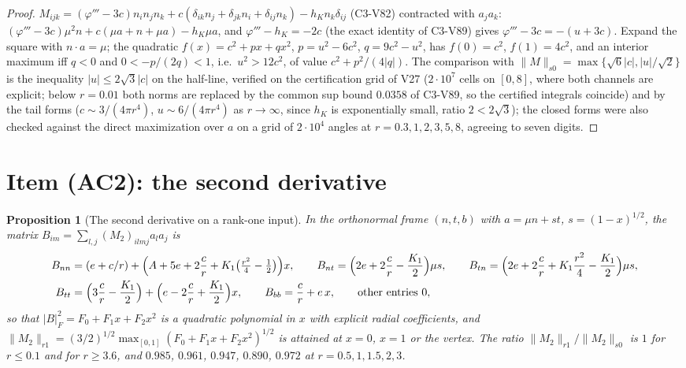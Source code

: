 \documentclass[11pt]{article}
\theoremstyle{plain}
\newtheorem{proposition}[theorem]{Proposition}
\theoremstyle{definition}
\theoremstyle{remark}
\begin{document}
\begin{proof}
\(M_{ijk}=(\varphi'''-3c)n_in_jn_k+c(\delta_{ik}n_j+\delta_{jk}n_i+\delta_{ij}n_k)-h_Kn_k\delta_{ij}\) (C3-V82) contracted
with \(a_ja_k\): \((\varphi'''-3c)\mu^2n+c(\mu a+n+\mu a)-h_K\mu a\), and \(\varphi'''-h_K=-2c\) (the exact
identity of C3-V89) gives \(\varphi'''-3c=-(u+3c)\).  Expand the square with
\(n\cdot a=\mu\); the quadratic \(f(x)=c^2+px+qx^2\), \(p=u^2-6c^2\), \(q=9c^2-u^2\), has
\(f(0)=c^2\), \(f(1)=4c^2\), and an interior maximum iff \(q<0\) and \(0<-p/(2q)<1\),
i.e.\ \(u^2>12c^2\), of value \(c^2+p^2/(4|q|)\).  The comparison with \(\|M\|_{s0}=\max\{\sqrt6|c|,|u|/\sqrt2\}\)
is the inequality \(|u|\le2\sqrt3|c|\) on the half-line, verified on the
certification grid of V27 (\(2\cdot10^7\) cells on \([0,8]\), where both channels are
explicit; below \(r=0.01\) both norms are replaced by the common sup bound
\(0.0358\) of C3-V89, so the certified integrals coincide) and by the
tail forms (\(c\sim3/(4\pi r^4)\), \(u\sim6/(4\pi r^4)\) as \(r\to\infty\), since \(h_K\) is exponentially
small, ratio \(2<2\sqrt3\)); the closed forms
were also checked against the direct maximization over \(a\) on a grid
of \(2\cdot10^4\) angles at \(r=0.3,1,2,3,5,8\), agreeing to seven digits.
\end{proof}

\section{Item (AC2): the second derivative}
\label{sec:c4v26-second}

\begin{proposition}[The second derivative on a rank-one input]
\label{prop:c4v26-second}
In the orthonormal frame \((n,t,b)\) with \(a=\mu n+st\), \(s=(1-x)^{1/2}\), the matrix
\(B_{im}=\sum_{l,j}(M_2)_{ilmj}a_la_j\) is
\begin{align}
 B_{nn}&=(e+c/r)+\Bigl(A+5e+2\frac cr+K_1\bigl(\tfrac{r^2}4-\tfrac12\bigr)\Bigr)x,\qquad
 B_{nt}=\Bigl(2e+2\frac cr-\frac{K_1}2\Bigr)\mu s,\qquad
 B_{tn}=\Bigl(2e+2\frac cr+K_1\frac{r^2}4-\frac{K_1}2\Bigr)\mu s,\notag\\
 B_{tt}&=\Bigl(3\frac cr-\frac{K_1}2\Bigr)+\Bigl(e-2\frac cr+\frac{K_1}2\Bigr)x,\qquad
 B_{bb}=\frac cr+e\,x,\qquad\text{other entries }0,
 \label{eq:c4v26-entries}
\end{align}
so that \(|B|_F^2=F_0+F_1x+F_2x^2\) is a quadratic polynomial in \(x\) with explicit
radial coefficients, and \(\|M_2\|_{r1}=(3/2)^{1/2}\max_{[0,1]}(F_0+F_1x+F_2x^2)^{1/2}\) is attained at
\(x=0\), \(x=1\) or the vertex.  The ratio \(\|M_2\|_{r1}/\|M_2\|_{s0}\) is \(1\) for \(r\le0.1\) and for
\(r\ge3.6\), and \(0.985\), \(0.961\), \(0.947\), \(0.890\), \(0.972\) at \(r=0.5,1,1.5,2,3\).
\end{proposition}
\end{document}

